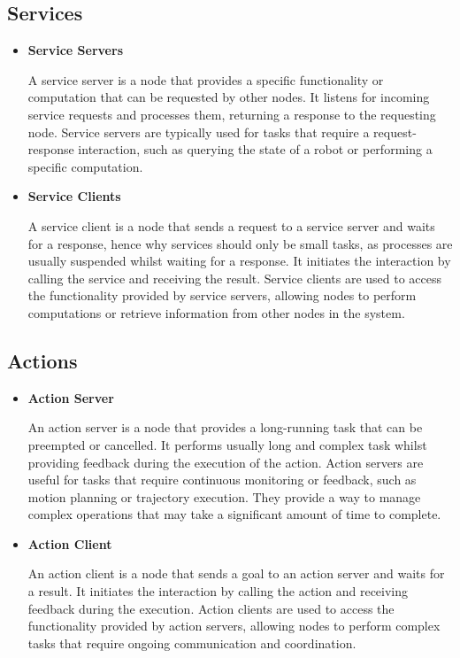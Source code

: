 \documentclass[10pt,a4paper,english]{article}
\begin{document}
\subsection{Services}
    \begin{itemize}
    \item \textbf{Service Servers} \par
    A service server is a node that provides a specific functionality or computation that can be requested by other nodes. It listens for incoming service requests and processes them, returning a response to the requesting node. Service servers are typically used for tasks that require a request-response interaction, such as querying the state of a robot or performing a specific computation. 
    \item \textbf{Service Clients} \par
    A service client is a node that sends a request to a service server and waits for a response, hence why services should only be small tasks, as processes are usually suspended whilst waiting for a response. It initiates the interaction by calling the service and receiving the result. Service clients are used to access the functionality provided by service servers, allowing nodes to perform computations or retrieve information from other nodes in the system.
    \end{itemize}

\subsection{Actions}
    \begin{itemize}
    \item \textbf{Action Server} \par
    An action server is a node that provides a long-running task that can be preempted or cancelled. It performs usually long and complex task whilst providing feedback during the execution of the action. Action servers are useful for tasks that require continuous monitoring or feedback, such as motion planning or trajectory execution. They provide a way to manage complex operations that may take a significant amount of time to complete.
    \item \textbf{Action Client} \par
    An action client is a node that sends a goal to an action server and waits for a result. It initiates the interaction by calling the action and receiving feedback during the execution. Action clients are used to access the functionality provided by action servers, allowing nodes to perform complex tasks that require ongoing communication and coordination.
    \end{itemize}
\end{document}
